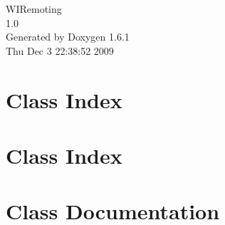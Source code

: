 \documentclass[letterpaper]{book}
\begin{document}
\hypersetup{pageanchor=false}
\begin{titlepage}
\vspace*{7cm}
\begin{center}
{\Large WIRemoting \\[1ex]\large 1.0 }\\
\vspace*{1cm}
{\large Generated by Doxygen 1.6.1}\\
\vspace*{0.5cm}
{\small Thu Dec 3 22:38:52 2009}\\
\end{center}
\end{titlepage}
\clearemptydoublepage
{}
\tableofcontents
\clearemptydoublepage
{}
\hypersetup{pageanchor=true}
\chapter{Class Index}

\chapter{Class Index}

\chapter{Class Documentation}


















\printindex
\end{document}
